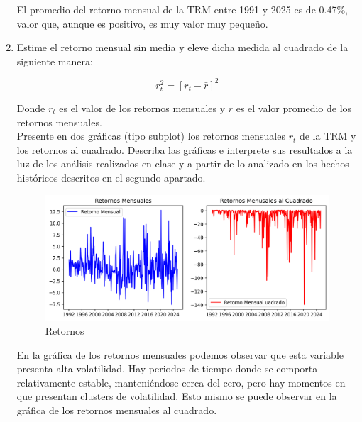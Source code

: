 \documentclass{article}
\theoremstyle{remark}
\theoremstyle{definition}
\begin{document}
\begin{enumerate}[label = \emph{\alph*})]
\begin{tcolorbox}[title=Soluci\'on 2.b]
            

El promedio del retorno mensual de la TRM entre 1991 y 2025 es de 0.47\%, valor que, aunque es positivo, es muy valor muy pequeño. 
        \end{tcolorbox}
    \item {Estime el retorno mensual sin media y eleve dicha medida al cuadrado de la siguiente manera: }

    \begin{equation}
        r_t^2=[r_t-\bar{r}]^2
    \end{equation}

    {Donde $r_t$ es el valor de los retornos mensuales y $\bar{r}$ es el valor promedio de los retornos mensuales.} \\
    
    {Presente en dos gr\'aficas (tipo subplot) los retornos mensuales $r_t$ de la TRM y los retornos al cuadrado. Describa las gr\'aficas e interprete sus resultados a la luz de los an\'alisis realizados en clase y a partir de lo analizado en los hechos hist\'oricos descritos en el segundo apartado.}
        \begin{tcolorbox}[title=Soluci\'on 2.c]
            \begin{figure}[H]
                \centering
                \includegraphics[width=0.9\linewidth]{output/subplot_retornos.png}
                \caption{Retornos}
                \label{fig:retornos}
            \end{figure}

En la gráfica de los retornos mensuales podemos observar que esta variable presenta alta volatilidad. Hay periodos de tiempo donde se comporta relativamente estable, manteniéndose cerca del cero, pero hay momentos en que presentan clusters de volatilidad. Esto mismo se puede observar en la gráfica de los retornos mensuales al cuadrado.
            
        \end{tcolorbox}
\end{enumerate}
\end{document}
